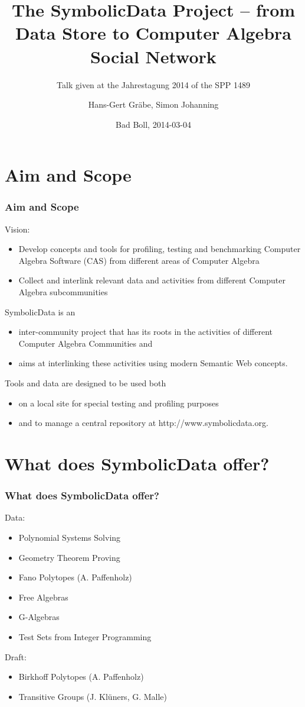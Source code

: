 \documentclass{beamer}
\title[The SymbolicData Project]{The SymbolicData Project -- from Data Store to
  Computer Algebra Social Network}
\subtitle{Talk given at the Jahrestagung 2014 of the SPP 1489}
\author[Gr\"abe, Johanning]{Hans-Gert Gr\"abe, Simon Johanning}
\institute[Uni Leipzig]{Leipzig University, Germany\\
\texttt{http://bis.informatik.uni-leipzig.de/HansGertGraebe}}
\date{Bad Boll, 2014-03-04}
\begin{document}
\begin{frame}
\titlepage
\end{frame}
\section{Aim and Scope}
\begin{frame}\frametitle{Aim and Scope}
Vision:
\begin{itemize}
\item Develop concepts and tools for profiling, testing and benchmarking
  Computer Algebra Software (CAS) from different areas of Computer Algebra
\item Collect and interlink relevant data and activities from different
  Computer Algebra subcommunities
\end{itemize}
{SymbolicData is an}
\begin{itemize}
\item inter-community project that has its roots in the activities of
  different Computer Algebra Communities and
\item aims at interlinking these activities using modern Semantic Web
  concepts. 
\end{itemize}
{Tools and data are designed to be used both}
\begin{itemize}
\item on a local site for special testing and profiling purposes
\item and to manage a central repository at http://www.symbolicdata.org.
\end{itemize}
\end{frame}

\section{What does SymbolicData offer?}
\begin{frame}\frametitle{What does SymbolicData offer?}
Data:
\begin{itemize}
\item Polynomial Systems Solving
\item Geometry Theorem Proving
\item Fano Polytopes (A. Paffenholz)
\item Free Algebras
\item G-Algebras
\item Test Sets from Integer Programming
\end{itemize}
{Draft:}
\begin{itemize}
\item Birkhoff Polytopes (A. Paffenholz)
\item Transitive Groups (J. Kl\"uners, G. Malle)
\end{itemize}
\end{frame}
\end{document}
